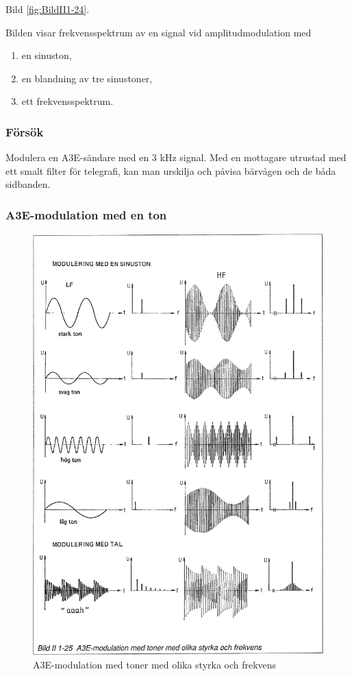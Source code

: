 Bild \ref{fig:BildII1-24}.

Bilden visar frekvensspektrum av en signal vid amplitudmodulation med

\begin{enumerate}[label=\alph*.,noitemsep]
\item en sinuston,
\item en blandning av tre sinustoner,
\item ett frekvensspektrum.
\end{enumerate}

\subsubsection{Försök}

Modulera en A3E-sändare med en 3 kHz signal. Med en mottagare utrustad med ett
smalt filter för telegrafi, kan man urskilja och påvisa bärvågen och de båda
sidbanden.

\subsubsection{A3E-modulation med en ton}

\begin{figure}
\includegraphics[width=\textwidth]{images/bild_2_1-25}
\caption{A3E-modulation med toner med olika styrka och frekvens}
\label{fig:BildII1-25}
\end{figure}

